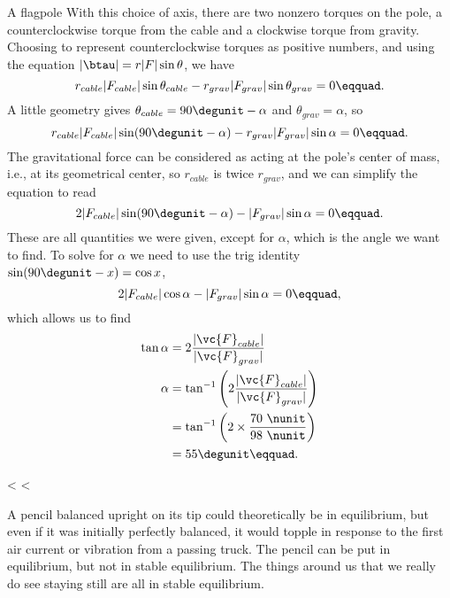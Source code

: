 \begin{eg}{A flagpole}
With this choice of axis, there are two nonzero torques on
the pole, a counterclockwise torque from the cable and a
clockwise torque from gravity. Choosing to represent
counterclockwise torques as positive numbers, and using the equation
$|\btau| =r|F| \sin \theta$, we have
\begin{equation*}
                r_{cable} |F_{cable}| \sin   \theta_{cable} - r_{grav}|F_{grav}|\sin  \theta_{grav}  =  0\eqquad.
\end{equation*}
A little geometry gives $\theta_{cable}=90\degunit-\alpha$ and $\theta_{grav}=\alpha$, so
\begin{equation*}
                r_{cable} |F_{cable}| \sin   (90\degunit-\alpha) - r_{grav}|F_{grav}| \sin   \alpha  =  0\eqquad.
\end{equation*}
The gravitational force can be considered as acting at the
pole's center of mass, i.e., at its geometrical center, so
$r_{cable}$ is twice $r_{grav}$, and we can simplify
the equation to read
\begin{equation*}
                2 |F_{cable}| \sin   (90\degunit-\alpha) - |F_{grav}| \sin   \alpha =  0\eqquad.
\end{equation*}
These are all quantities we were given, except for $\alpha$,
which is the angle we want to find. To solve for $\alpha$
we need to use the trig identity
$\sin (90\degunit-x)= \cos x$,
\begin{equation*}
                2 |F_{cable}| \cos  \alpha - |F_{grav}| \sin   \alpha  =  0\eqquad,
\end{equation*}
which allows us to find
\begin{align*}
 \tan\alpha  &= 2\frac{|\vc{F}_{cable}|}{|\vc{F}_{grav}|}\\
 \alpha &= \tan^{-1}\left(2\frac{|\vc{F}_{cable}|}{|\vc{F}_{grav}|}\right)\\
        &= \tan^{-1}\left(2\times\frac{70\ \nunit}{98\ \nunit}\right)\\
        &= 55\degunit\eqquad.
\end{align*}
\end{eg}

<%
<%

A pencil balanced upright on its tip could theoretically be
in equilibrium, but even if it was initially perfectly
balanced, it would topple in response to the first air
current or vibration from a passing truck. The pencil can be
put in equilibrium, but not in stable equilibrium. The
things around us that we really do see staying still are all
in stable equilibrium.

